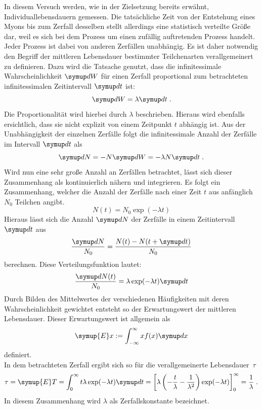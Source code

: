 In diesem Versuch werden, wie in der Zielsetzung bereits erwähnt, Individuallebensdauern gemessen. Die tatsächliche Zeit
von der Entstehung eines Myons bis zum Zerfall desselben stellt allerdings eine statistisch verteilte Größe dar, weil es
sich bei dem Prozess um einen zufällig auftretenden Prozess handelt. Jeder Prozess ist dabei von anderen Zerfällen
unabhängig. Es ist daher notwendig den Begriff der mittleren Lebensdauer bestimmter Teilchenarten verallgemeinert zu definieren.
Dazu wird die Tatsache genutzt, dass die infinitessimale Wahrscheinlichkeit $\upd W$ für einen Zerfall proportional zum
betrachteten infinitessimalen Zeitintervall $\upd t$ ist:
%
\begin{equation}
  \upd W=\lambda\upd t \; .
\end{equation}
%
Die Proportionalität wird hierbei durch $\lambda$ beschrieben. Hieraus wird ebenfalls ersichtlich, dass sie nicht explizit von einem Zeitpunkt $t$ abhängig ist. Aus der Unabhängigkeit
der einzelnen Zerfälle folgt die infinitessimale Anzahl der Zerfälle im Intervall $\upd t$ als
%
\begin{equation}
  \upd N=-N\upd W=-\lambda N\upd t \; .
\end{equation}
%
Wird nun eine sehr große Anzahl an Zerfällen betrachtet, lässt sich dieser Zusammenhang als kontinuierlich nähern und
integrieren. Es folgt ein Zusammenhang, welcher die Anzahl der Zerfälle nach einer Zeit $t$ aus anfänglich $N_0$
Teilchen angibt.
%
\begin{equation}
  N(t)=N_0\exp(-\lambda t)
\end{equation}
%
Hieraus lässt sich die Anzahl $\upd N$ der Zerfälle in einem Zeitintervall $\upd t$ aus
%
\begin{equation}
  \frac{\upd N}{N_0}=\frac{N(t)-N(t+\upd t)}{N_0}
\end{equation}
%
berechnen. Diese Verteilungsfunktion lautet:
%
\begin{equation}
  \frac{\upd N(t)}{N_0}=\lambda\exp(-\lambda t)\upd t
\end{equation}
%
Durch Bilden des Mittelwertes der verschiedenen Häufigkeiten mit deren Wahrscheinlichkeit gewichtet entsteht so der
Erwartungswert der mittleren Lebensdauer. Dieser Erwartungswert ist allgemein als
%
\begin{equation}
  \symup{E}x:=\int_{-\infty}^{\infty}xf(x)\upd x
\end{equation}
%
definiert. \\ In dem betrachteten Zerfall ergibt sich so für die verallgemeinerte Lebensdauer~$\tau$
%
\begin{equation}
  \tau=\symup{E}T=\int_0^\infty t\lambda\exp(-\lambda t)\upd t=\left[\lambda\left(-\frac{t}{\lambda}-\frac{1}{\lambda^2}\right)\exp(-\lambda t)\right]^\infty_0=\frac{1}{\lambda} \; .
\end{equation}
%
In diesem Zusammenhang wird $\lambda$ als Zerfallskonstante bezeichnet.
